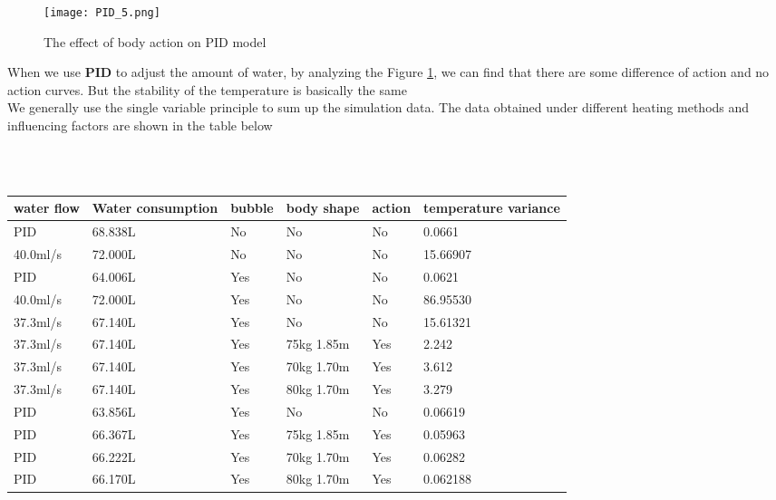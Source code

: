 \documentclass{mcmthesis}
\begin{document}
\begin{figure}[H]
	\centerline{\texttt{[image: PID\_5.png]}}
	\caption{The effect of body action on PID model}
	\label{action_pid}	
\end{figure}
When we use \textbf{PID} to adjust the amount of water, by analyzing the Figure \ref{action_pid}, we can find that there are some difference of action and no action curves. But the stability of the temperature is basically the same\\
\indent We generally use the single variable principle to sum up the simulation data. The data obtained under different heating methods and influencing factors are shown in the table below 
\begin{table}[H]
	\setlength{\abovecaptionskip}{0pt}
	\setlength{\belowcaptionskip}{0pt}
	\\
	\\
	\begin{tabular}{p{2cm}|p{2cm}|p{1.5cm}|p{3cm}|p{1cm}|p{2cm}}
		\hline
		\rowcolor[gray]{0.9}\bf{water flow}	&\bf{Water consumption} &\bf{bubble}&\bf{body shape}&\bf{action}&\bf{temperature variance} \\
		\hline
		PID 	 & 68.838L &No  &No &No &0.0661\\
		40.0ml/s   & 72.000L &No  &No &No &15.66907\\
		\hline
		PID 	 & 64.006L &Yes &No &No &0.0621\\
		40.0ml/s   & 72.000L &Yes &No &No &86.95530\\
		\hline
		37.3ml/s & 67.140L &Yes &No &No &15.61321\\
		37.3ml/s & 67.140L &Yes &75kg 1.85m &Yes &2.242\\	
		37.3ml/s & 67.140L &Yes &70kg 1.70m &Yes &3.612\\
		37.3ml/s & 67.140L &Yes &80kg 1.70m &Yes &3.279\\
		\hline
		PID & 63.856L &Yes &No &No &0.06619\\
		PID & 66.367L &Yes &75kg 1.85m &Yes &0.05963\\	
		PID & 66.222L &Yes &70kg 1.70m &Yes &0.06282\\
		PID & 66.170L &Yes &80kg 1.70m &Yes &0.062188\\
		\hline
	\end{tabular}
\end{table}
\end{document}
